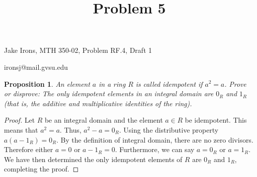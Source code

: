 \documentclass[11 pt]{article}
\title{Problem 5}
\newtheorem{proposition}{Proposition}
\newcommand{\newpar}{\vspace{.15in}\noindent}
\begin{document}
\noindent Jake Irons, MTH 350-02, Problem RF.4, Draft 1

\noindent ironsj@mail.gvsu.edu

\newpar
\begin{proposition}
An element $a$ in a ring $R$ is called idempotent if $a^2 = a$. Prove or disprove: The only idempotent elements in an integral domain are $0_R$ and $1_R$ (that is, the additive and multiplicative identities
of the ring).


\end{proposition}
\begin{proof}
Let $R$ be an integral domain and the element $a \in R$ be idempotent. This means that $a^2=a$. Thus, $a^2-a=0_R$. Using the distributive property $a(a-1_R)=0_R$. By the definition of integral domain, there are no zero divisors. Therefore either $a=0$ or $a-1_R=0$. Furthermore, we can say $a=0_R$ or $a=1_R$. We have then determined the only idempotent elements of $R$ are $0_R$ and $1_R$, completing the proof.

\end{proof}
\end{document}
